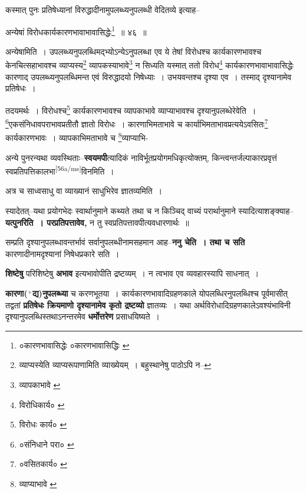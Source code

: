 \documentclass[article,12pt,a4paper]{memoir}
\newcommand{\add}[1]{($^{+}$#1)}
\begin{document}
	  \pstart कस्मात् पुनः प्रतिषेध्यानां विरुद्धादीनामुपलब्ध्यनुपलब्धी वेदितव्ये इत्याह--
	\pend
       

	  \pstart अन्येषां विरोधकार्यकारणभावाभावासिद्धेः\footnote{०कारणभावासिद्धेः \cite{dp-edE} ०कारणभावासिद्धिः \cite{dp-msB} \cite{dp-edP} \cite{dp-edH}} ॥ ४६ ॥
	\pend
       

	  \pstart अन्येषामिति । उपलब्ध्यनुपलब्धिमद्भ्योऽन्येऽनुपलब्धा एव ये तेषां विरोधश्च कार्यकारणभावश्च केनचित्सहाभावश्च व्याप्यस्य\footnote{व्याप्यस्येति व्याप्यरूपाणामिति व्याख्येयम् । बहुस्थानेषु पाठोऽपि न--\cite{dp-msD-n}} व्यापकस्याभावे\footnote{व्यापकाभावे \cite{dp-msC}} न सिध्यति यस्मात् ततो विरोध\footnote{विरोधिकार्य० \cite{dp-msA} \cite{dp-msB} \cite{dp-edP} \cite{dp-edE} \cite{dp-edH} \cite{dp-edN}} कार्यकारणभावाभावासिद्धेः कारणाद् उपलब्ध्यनुपलब्धिमन्त एवं विरुद्धादयो निषेध्याः । उभयवन्तश्च दृश्या एव । तस्माद् दृश्यानामेव प्रतिषेधः ।
	\pend
       

	  \pstart तदयमर्थः । विरोधश्च\footnote{विरोधः कार्य० \cite{dp-msA} \cite{dp-edP} \cite{dp-edH} \cite{dp-edE}} कार्यकारणभावश्च व्यापकाभावे व्याप्याभावश्च दृश्यानुपलब्धेरेवेति । \footnote{०संनिधाने परा० \cite{dp-msC}}एकसंनिधावपराभावप्रतीतौ ज्ञातो विरोधः । कारणाभिमताभावे च कार्याभिमताभावप्रत्ययेऽवसितः\footnote{०वसितकार्य० \cite{dp-edP} \cite{dp-edH} \cite{dp-msA} \cite{dp-msB}} कार्यकारणभावः । व्यापकाभिमताभावे च \footnote{व्याप्याभावे \cite{dp-msA} \cite{dp-msB} \cite{dp-msD} \cite{dp-edP} \cite{dp-edH} \cite{dp-edE} \cite{dp-edN}}व्याप्याभि-
	\pend
      

	  \pstart अन्ये पुनरन्यथा व्यवस्थिताः--\textbf{स्वयमपी}त्यादिकं नाविर्भूतप्रयोगमधिकृत्योक्तम्, किन्त्वन्तर्जल्पाकारप्रवृत्तं स्वप्रतिपत्तिकालभा\leavevmode\textsuperscript{\rmlatinfont\tiny [56a/ms]}विनमिति ।
	\pend
      

	  \pstart अत्र च साध्वसाधु वा व्याख्यानं साधुभिरेव ज्ञातव्यमिति ।
	\pend
      

	  \pstart स्यादेतत्--यथा प्रयोगभेदः स्वार्थानुमाने कथ्यते तथा च न किञ्चिद् वाच्यं परार्थानुमाने स्यादित्याशङ्क्याह--\textbf{यत्पुनरिति । परप्रतिपत्तावेव,} न तु स्वप्रतिपत्तावपीत्यवधारणार्थः ॥
	\pend
      

	  \pstart सम्प्रति दृश्यानुपलब्धावन्तर्भावं सर्वानुपलब्धीनामसहमान आह--\textbf{ननु चेति । तथा च सति} कारणादीनामदृश्यानां निषेधप्रकारे सति ।
	\pend
      

	  \pstart \textbf{शिष्टेषु} परिशिष्टेषु \textbf{अभाव} इत्यभावोपीति द्रष्टव्यम् । न त्वभाव एव व्यवहारस्यापि साधनात् ।
	\pend
      

	  \pstart \textbf{कारणा\add{द्य}नुपलब्ध्या} च करणभूतया । कार्यकारणभावादिग्रहणकाले योपलब्धिरनुपलब्धिश्च पूर्वमासीत् तद्वतां \textbf{प्रतिषेधः क्रियमाणो दृश्यानामेव कृतो द्रष्टव्यो} ज्ञातव्यः । यथा अर्थविरोधादिग्रहणकालेऽवश्यंभाविनी दृश्यानुपलब्धिस्तथाऽनन्तरमेव \textbf{धर्मोत्तरेण} प्रसाधयिष्यते ।
	\pend
      
\end{document}
